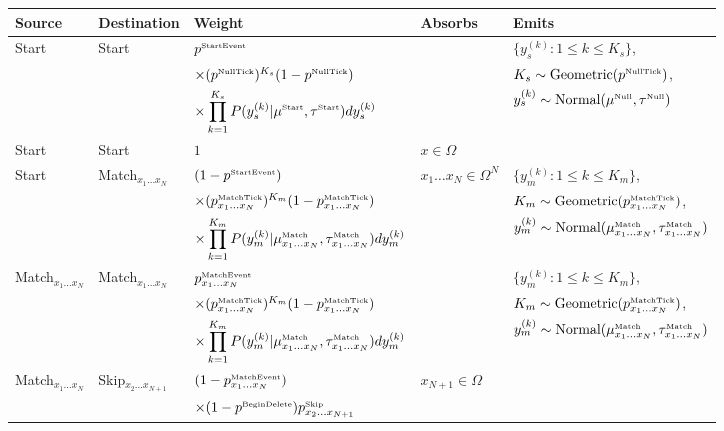\documentclass[10pt]{article}
\begin{document}
\noindent
\begin{tabular}{lllll}
\hline
Source & Destination & Weight & Absorbs & Emits \\
\hline
Start & Start & $p^{\mbox{\tiny StartEvent}}$ & & $\{ y_s^{(k)}: 1 \leq k \leq K_s \}$, \\
& & $\times (p^{\mbox{\tiny NullTick}})^{K_s} (1-p^{\mbox{\tiny NullTick}})$ & & $K_s \sim \mbox{Geometric}(p^{\mbox{\tiny NullTick}})$, \\
& & $\times \displaystyle \prod_{k=1}^{K_s} P(y^{(k)}_s|\mu^{\mbox{\tiny Start}},\tau^{\mbox{\tiny Start}}) dy^{(k)}_s$ & & $y_s^{(k)} \sim \mbox{Normal}(\mu^{\mbox{\tiny Null}},\tau^{\mbox{\tiny Null}})$ \\
Start & Start & $1$ & $x \in \Omega$ & \\
Start & Match${}_{x_1 \ldots x_N}$ & $(1 - p^{\mbox{\tiny StartEvent}})$ & $x_1 \ldots x_N \in \Omega^N$ & $\{ y_m^{(k)}: 1 \leq k \leq K_m \}$, \\
& & $\times (p^{\mbox{\tiny MatchTick}}_{x_1\ldots x_N})^{K_m} (1-p^{\mbox{\tiny MatchTick}}_{x_1\ldots x_N})$ & & $K_m \sim \mbox{Geometric}(p^{\mbox{\tiny MatchTick}}_{x_1\ldots x_N})$, \\
& & $\times \displaystyle \prod_{k=1}^{K_m} P(y^{(k)}_m|\mu^{\mbox{\tiny Match}}_{x_1\ldots x_N},\tau^{\mbox{\tiny Match}}_{x_1\ldots x_N}) dy^{(k)}_m$ & & $y_m^{(k)} \sim \mbox{Normal}(\mu^{\mbox{\tiny Match}}_{x_1\ldots x_N},\tau^{\mbox{\tiny Match}}_{x_1\ldots x_N})$ \\
Match${}_{x_1 \ldots x_N}$ & Match${}_{x_1 \ldots x_N}$ & ${p^{\mbox{\tiny MatchEvent}}_{x_1\ldots x_N}}$ & & $\{ y_m^{(k)}: 1 \leq k \leq K_m \}$, \\
& & $\times (p^{\mbox{\tiny MatchTick}}_{x_1\ldots x_N})^{K_m} (1-p^{\mbox{\tiny MatchTick}}_{x_1\ldots x_N} )$ & & $K_m \sim \mbox{Geometric}(p^{\mbox{\tiny MatchTick}}_{x_1\ldots x_N})$, \\
& & $\times \displaystyle \prod_{k=1}^{K_m} P(y^{(k)}_m|\mu^{\mbox{\tiny Match}}_{x_1\ldots x_N},\tau^{\mbox{\tiny Match}}_{x_1\ldots x_N}) dy^{(k)}_m$ & & $y_m^{(k)} \sim \mbox{Normal}(\mu^{\mbox{\tiny Match}}_{x_1\ldots x_N},\tau^{\mbox{\tiny Match}}_{x_1\ldots x_N})$ \\
Match${}_{x_1 \ldots x_N}$ & Skip${}_{x_2 \ldots x_{N+1}}$ & $(1 - {p^{\mbox{\tiny MatchEvent}}_{x_1\ldots x_N}})$ & $x_{N+1} \in \Omega$ & \\
& & $\times (1 - p^{\mbox{\tiny BeginDelete}}) p^{\mbox{\tiny Skip}}_{x_2\ldots x_{N+1}}$ & & \\

\end{tabular}
\end{document}
